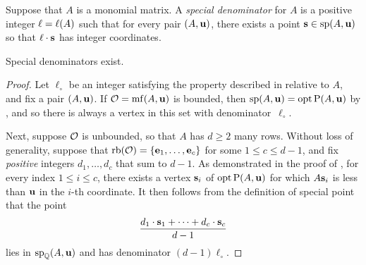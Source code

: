 \documentclass[11pt]{amsart}
\begin{document}


\begin{definition}  Suppose that $A$ is a monomial matrix. A \emph{special denominator} for $A$ is a positive integer $\ell = \ell(A)$ such that for every pair $(A, \mathbf{u})$, there exists a point $\mathbf{s} \in \operatorname{sp}(A, \mathbf{u})$ so that $\ell \cdot \mathbf{s}$ has integer coordinates.
\end{definition}

\begin{theorem}  
\label{special-denominators-exist:  T}
Special denominators exist.
\end{theorem}


\begin{proof}
   Let $\ell_{\circ}$ be an integer satisfying the property described in  relative to $A$, and fix a pair $(A, \mathbf{u})$.
   If $\mathcal{O} = \operatorname{mf}(A, \mathbf{u})$ is bounded, then $\operatorname{sp}(A, \mathbf{u}) = \operatorname{opt} \mathrm{P}(A, \mathbf{u})$ by , and so there is always a vertex in this set with denominator~$\ell_{\circ}$.

   Next, suppose $\mathcal{O}$ is unbounded, so that $A$ has $d \geq 2$ many rows.
   Without loss of generality, suppose that $\operatorname{rb}(\mathcal{O}) = \{ \mathbf{e}_1, \ldots, \mathbf{e}_c \}$ for some $1 \leq c \leq d-1$, and fix \emph{positive} integers $d_1, \ldots, d_c$ that sum to $d-1$.
   As demonstrated in the  proof of , for every index  $1 \leq i \leq c$, there exists a vertex $\mathbf{s}_i$ of $\operatorname{opt} \mathrm{P}(A, \mathbf{u})$ for which $A \mathbf{s}_i$ is less than $\mathbf{u}$ in the $i$-th coordinate.
   It then follows from the definition of special point that the point
   \[ \frac{ d_1 \cdot \mathbf{s}_1 + \cdots + d_c \cdot  \mathbf{s}_c}{d-1}  \]
   lies in $\operatorname{sp}_{\mathbb{Q}}(A, \mathbf{u})$ and has denominator $(d-1)\ell_{\circ}$.  
\end{proof}
\end{document}
